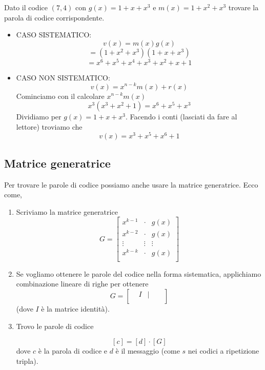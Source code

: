 \documentclass[12pt]{report}
\begin{document}
    \begin{exmp}
        Dato il codice $(7,4)$ con $g(x) = 1 + x + x^3$ e $m(x) = 1 + x^2 + x^3$ trovare la parola di codice corrispondente.
        \begin{itemize}
            \item CASO SISTEMATICO: $$v(x) = m(x) g(x)$$
            $$= (1 + x^2 + x^3) (1+x+x^3)$$
            $$= x^6 + x^5 + x^4 + x^3 + x^2 + x + 1$$
            \item CASO NON SISTEMATICO:
            $$v(x) = x^{n-k} m(x) + r(x)$$
            Cominciamo con il calcolare $x^{n-k} m(x)$
            $$x^3(x^3 + x^2 + 1) = x^6 + x^5 + x^3$$
            Dividiamo per $g(x) = 1 + x + x^3$. Facendo i conti (lasciati da fare al lettore) troviamo che
            $$v(x) = x^3 + x^5 + x^6 + 1$$
        \end{itemize}
    \end{exmp}

    \subsection{Matrice generatrice}
    Per trovare le parole di codice possiamo anche usare la matrice generatrice. Ecco come,

    \begin{enumerate}
        \item Scriviamo la matrice generatrice
        \[
            G = \begin{bmatrix}
                    x^{k-1} & \cdot & g(x) \\
                    x^{k-2} & \cdot & g(x) \\
                    \vdots & \vdots & \vdots \\
                    x^{k-k} & \cdot & g(x) \\
            \end{bmatrix}
        \]
        \item Se vogliamo ottenere le parole del codice nella forma sistematica, applichiamo combinazione lineare di righe per ottenere
        \[
            G = \begin{bmatrix}
                    & I  & | & &\\
            \end{bmatrix}
        \]
        (dove $I$ è la matrice identità).
        \item Trovo le parole di codice

        $$[c] = [d] \cdot [G]$$
        dove $c$ è la parola di codice e $d$ è il messaggio (come $s$ nei codici a ripetizione tripla).
    \end{enumerate}
\end{document}
